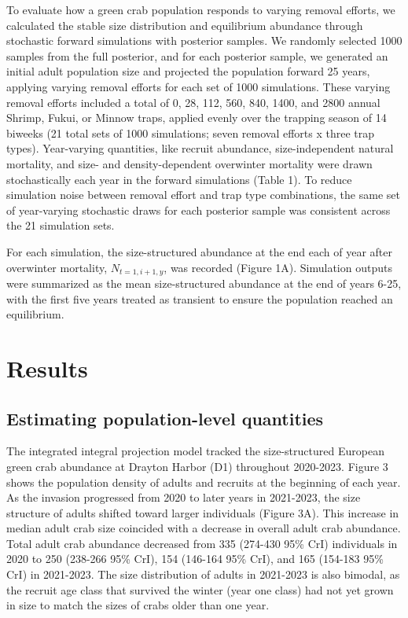 \documentclass{article}
\begin{document}
To evaluate how a green crab population responds to varying removal efforts, we calculated the stable size distribution and equilibrium abundance through stochastic forward simulations with posterior samples. We randomly selected 1000 samples from the full posterior, and for each posterior sample, we generated an initial adult population size and projected the population forward 25 years, applying varying removal efforts for each set of 1000 simulations. These varying removal efforts included a total of 0, 28, 112, 560, 840, 1400, and 2800 annual Shrimp, Fukui, or Minnow traps, applied evenly over the trapping season of 14 biweeks (21 total sets of 1000 simulations; seven removal efforts x three trap types). Year-varying quantities, like recruit abundance, size-independent natural mortality, and size- and density-dependent overwinter mortality were drawn stochastically each year in the forward simulations (Table 1). To reduce simulation noise between removal effort and trap type combinations, the same set of year-varying stochastic draws for each posterior sample was consistent across the 21 simulation sets. 

For each simulation, the size-structured abundance at the end each of year after overwinter mortality, $N_{t=1,i+1,y}$, was recorded (Figure 1A). Simulation outputs were summarized as the mean size-structured abundance at the end of years 6-25, with the first five years treated as transient to ensure the population reached an equilibrium.

\section{Results}

\subsection{Estimating population-level quantities}

The integrated integral projection model tracked the size-structured European green crab abundance at Drayton Harbor (D1) throughout 2020-2023. Figure 3 shows the population density of adults and recruits at the beginning of each year. As the invasion progressed from 2020 to later years in 2021-2023, the size structure of adults shifted toward larger individuals (Figure 3A). This increase in median adult crab size coincided with a decrease in overall adult crab abundance. Total adult crab abundance decreased from 335 (274-430 95\% CrI) individuals in 2020 to 250 (238-266 95\% CrI), 154 (146-164 95\% CrI), and 165 (154-183 95\% CrI) in 2021-2023. The size distribution of adults in 2021-2023 is also bimodal, as the recruit age class that survived the winter (year one class) had not yet grown in size to match the sizes of crabs older than one year.
\end{document}
